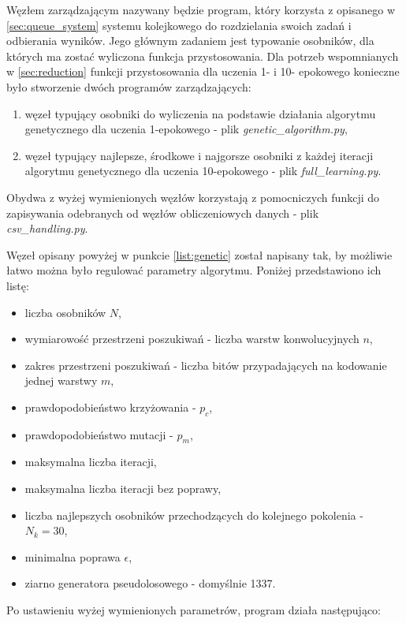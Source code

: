 Węzłem zarządzającym nazywany będzie program, który korzysta z opisanego w \ref{sec:queue_system} systemu kolejkowego do rozdzielania swoich zadań i odbierania wyników.
Jego głównym zadaniem jest typowanie osobników, dla których ma zostać wyliczona funkcja przystosowania.
Dla potrzeb wspomnianych w \ref{sec:reduction} funkcji przystosowania dla uczenia 1- i 10- epokowego konieczne było stworzenie dwóch programów zarządzających:
\begin{enumerate}
  \item węzeł typujący osobniki do wyliczenia na podstawie działania algorytmu genetycznego dla uczenia 1-epokowego - plik \textit{genetic\_algorithm.py}\label{list:genetic},
  \item węzeł typujący najlepsze, środkowe i najgorsze osobniki z każdej iteracji algorytmu genetycznego dla uczenia 10-epokowego - plik \textit{full\_learning.py}\label{list:full}.
\end{enumerate}
Obydwa z wyżej wymienionych węzłów korzystają z pomocniczych funkcji do zapisywania odebranych od węzłów obliczeniowych danych - plik \textit{csv\_handling.py}.

Węzeł opisany powyżej w punkcie \ref{list:genetic} został napisany tak, by możliwie łatwo można było regulować parametry algorytmu.
Poniżej przedstawiono ich listę:
\begin{itemize}
  \item liczba osobników $N$,
  \item wymiarowość przestrzeni poszukiwań - liczba warstw konwolucyjnych $n$,
  \item zakres przestrzeni poszukiwań - liczba bitów przypadających na kodowanie jednej warstwy $m$,
  \item prawdopodobieństwo krzyżowania - $p_{c}$,
  \item prawdopodobieństwo mutacji - $p_{m}$,
  \item maksymalna liczba iteracji,
  \item maksymalna liczba iteracji bez poprawy,
  \item liczba najlepszych osobników przechodzących do kolejnego pokolenia - $ N_{k} = 30$,
  \item minimalna poprawa $\epsilon$,
  \item ziarno generatora pseudolosowego - domyślnie 1337.
\end{itemize}

Po ustawieniu wyżej wymienionych parametrów, program działa następująco:

